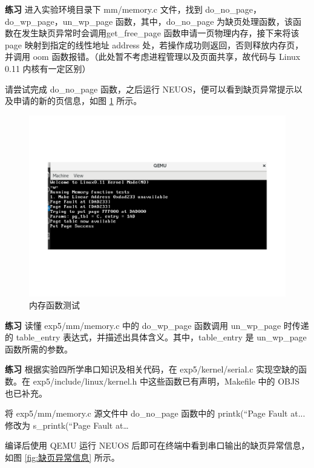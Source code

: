 \begin{mdframed}[hidealllines=true,backgroundcolor=gray!20]
\textbf{练习 }进入实验环境目录下 mm/memory.c 文件，找到 do\_no\_page，do\_wp\_page，un\_wp\_page 函数，其中，do\_no\_page 为缺页处理函数，该函数在发生缺页异常时会调用get\_free\_page 函数申请一页物理内存，接下来将该 page 映射到指定的线性地址 address 处，若操作成功则返回，否则释放内存页，并调用 oom 函数报错。（此处暂不考虑进程管理以及页面共享，故代码与 Linux 0.11 内核有一定区别）

请尝试完成 do\_no\_page 函数，之后运行 NEUOS，便可以看到缺页异常提示以及申请的新的页信息，如图 \ref{fig:内存函数测试} 所示。
\end{mdframed}

\begin{figure}[htbp]
    \centering
    \includegraphics[width=\textwidth]{img/内存函数测试.pdf}
    \caption{内存函数测试}
    \label{fig:内存函数测试}
\end{figure}

\begin{mdframed}[hidealllines=true,backgroundcolor=gray!20]
\textbf{练习 }读懂 exp5/mm/memory.c 中的 do\_wp\_page 函数调用 un\_wp\_page 时传递的 table\_entry 表达式，并描述出具体含义。其中，table\_entry 是 un\_wp\_page 函数所需的参数。
\end{mdframed}

\begin{mdframed}[hidealllines=true,backgroundcolor=gray!20]
\textbf{练习 }根据实验四所学串口知识及相关代码，在 exp5/kernel/serial.c 实现空缺的函数。在 exp5/include/linux/kernel.h 中这些函数已有声明，Makefile 中的 OBJS 也已补充。

将 exp5/mm/memory.c 源文件中 do\_no\_page 函数中的 printk(“Page Fault at... 修改为 s\_printk(“Page Fault at…

编译后使用 QEMU 运行 NEUOS 后即可在终端中看到串口输出的缺页异常信息，如图 \ref{fig:缺页异常信息} 所示。
\end{mdframed}

